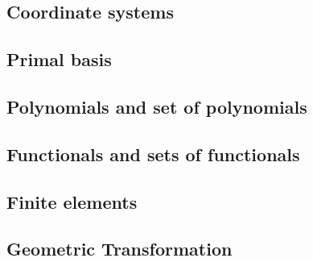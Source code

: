 \begin{frame}{}
  
\end{frame}

\subsection{Coordinate systems}
\label{sec:coordinate-systems}

\begin{frame}{}
  
\end{frame}

\subsection{Primal basis}
\label{sec:primal-basis}

\begin{frame}{}
  
\end{frame}

\subsection{Polynomials and set of polynomials}
\label{sec:polyn-set-polyn}

\begin{frame}{}
  
\end{frame}

\subsection{Functionals and sets of functionals}
\label{sec:functionals}

\begin{frame}{}
  
\end{frame}

\subsection{Finite elements}
\label{sec:finite-elements}

\begin{frame}{}
  
\end{frame}

\subsection{Geometric Transformation}
\label{sec:geom-transf}

